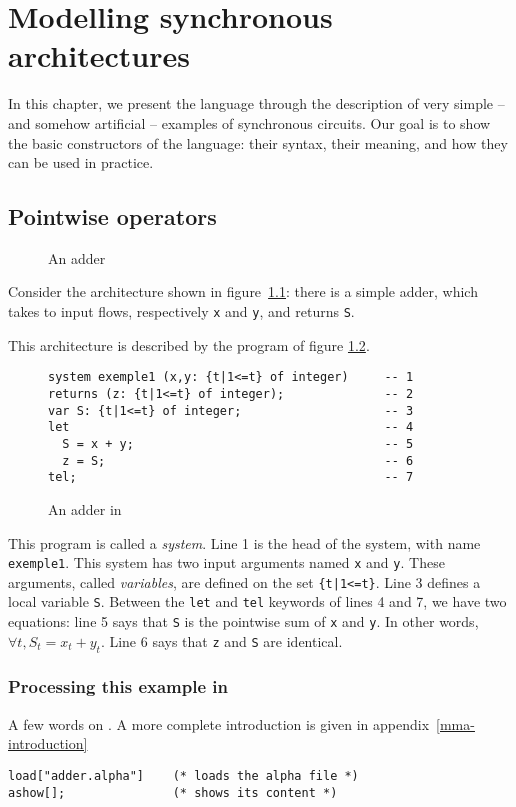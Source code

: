 \chapter{Modelling synchronous architectures}
\label{chap2}
In this chapter, we present the {\alfa} language through the 
description of very simple -- and somehow artificial -- examples
of synchronous circuits. Our goal is to show the basic constructors
of the language: their syntax, their meaning, and how they can be
used in practice. 
% 
\section{Pointwise operators}
\begin{figure}[htbp]
\colorbox{red}{
\centerline{}}
\caption{An adder}\label{adder}
\end{figure}
Consider the architecture shown in figure~\ref{adder}: there is a 
simple adder, which takes to input flows, respectively {\tt x} and 
{\tt y}, and returns {\tt S}. 

This architecture is described by the {\alfa} program of figure \ref{adder-alpha}.
\begin{figure}[htbp]
%
\begin{verbatim}
system exemple1 (x,y: {t|1<=t} of integer)     -- 1
returns (z: {t|1<=t} of integer);              -- 2
var S: {t|1<=t} of integer;                    -- 3
let                                            -- 4
  S = x + y;                                   -- 5
  z = S;                                       -- 6
tel;                                           -- 7
\end{verbatim}
\caption{An adder in {\alfa}}\label{adder-alpha}
\end{figure}
This program is called a {\em system}. Line 1 is the head of the system, 
with name {\tt exemple1}. This system has two input arguments named
{\tt x} and {\tt y}. These arguments, called {\em variables}, are
defined on the set {\tt \{t|1<=t\}}. Line 3 defines a local variable
{\tt S}. Between the {\tt let} and {\tt tel} keywords of lines 4 and
7, we have two equations: line 5 says that {\tt S} is the pointwise sum of 
{\tt x} and {\tt y}. In other words, $\forall t, S_t = x_t + y_t$. 
Line 6 says that {\tt z} and {\tt S} are identical.
\subsection*{Processing this example in {\mmalfa}}
A few words on {\mma}. A more complete introduction is given in 
appendix~\ref{mma-introduction}
\begin{verbatim}
load["adder.alpha"]    (* loads the alpha file *)
ashow[];               (* shows its content *)
\end{verbatim}

